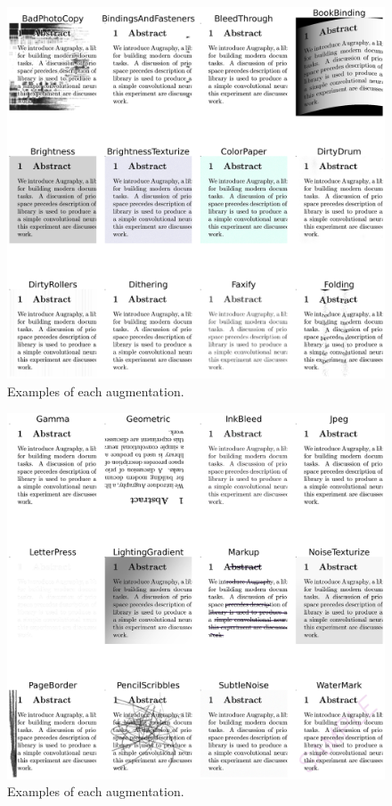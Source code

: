 \documentclass[runningheads]{llncs}
\begin{document}
\begin{figure}
\includegraphics[width=\textwidth]{augmentations1.png}
\caption{Examples of each augmentation.} \label{fig2}
\end{figure}

\begin{figure}
\includegraphics[width=\textwidth]{augmentations2.png}
\caption{Examples of each augmentation.} \label{fig3}
\end{figure}
\end{document}
